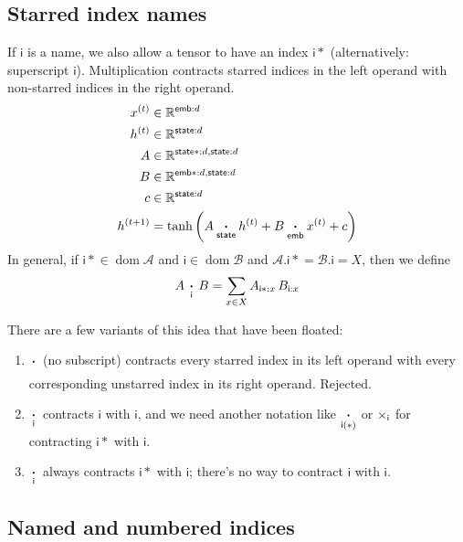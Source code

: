 \documentclass{article}
\newcommand{\name}[1]{\mathsf{#1}}
\newcommand{\nset}[2]{\name{#1}:#2}
\newcommand{\ndot}[1]{\mathbin{\mathop{\thinspace\boldsymbol\cdot\thinspace}\limits_{\name{#1}}}}
\DeclareMathOperator{\tupledom}{dom}
\newcommand{\tupleproj}[2]{#1.\name{#2}}
\begin{document}
\subsection{Starred index names}

If $\name{i}$ is a name, we also allow a tensor to have an index $\name{i*}$ (alternatively: superscript $\name{i}$). Multiplication contracts starred indices in the left operand with non-starred indices in the right operand.
\begin{align*}
x^{(t)} &\in \mathbb{R}^{\nset{emb}{d}} \\
h^{(t)} &\in \mathbb{R}^{\nset{state}{d}} \\
A &\in \mathbb{R}^{\nset{state*}{d}, \nset{state}{d}} \\
B &\in \mathbb{R}^{\nset{emb*}{d}, \nset{state}{d}} \\
c &\in \mathbb{R}^{\nset{state}{d}} \\
h^{(t+1)} &= \tanh\left( A \ndot{state} h^{(t)} + B \ndot{emb} x^{(t)} + c \right) 
\end{align*}
In general, if $\name{i*} \in \tupledom \mathcal{A}$ and $\name{i} \in \tupledom \mathcal{B}$ and $\tupleproj{\mathcal{A}}{i*} = \tupleproj{\mathcal{B}}{i} = X$, then we define
\begin{equation*}
A \ndot{i} B = \sum_{x \in X} A_{\nset{i*}{x}} \, B_{\nset{i}{x}}
\end{equation*}

There are a few variants of this idea that have been floated:
\begin{enumerate}
\item $\ndot{}$ (no subscript) contracts every starred index in its left operand with every corresponding unstarred index in its right operand. Rejected.
\item $\ndot{i}$ contracts $\name{i}$ with $\name{i}$, and we need another notation like $\ndot{i(*)}$ or $\mathop\times\displaylimits_{\name{i}}$ for contracting $\name{i*}$ with $\name{i}$.
\item $\ndot{i}$ always contracts $\name{i*}$ with $\name{i}$; there's no way to contract $\name{i}$ with $\name{i}$.
\end{enumerate}

\subsection{Named and numbered indices}
\label{sec:tensorsoftensors}
\end{document}
